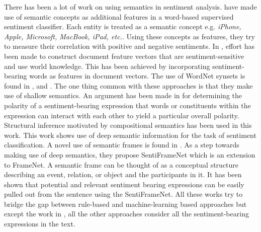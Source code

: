 There has been a lot of work on using semantics in sentiment analysis. \citep*{saif2012semantic} have made use of semantic concepts as additional features in a word-based 
supervised sentiment classifier. Each entity is treated as a semantic concept e.g. \textit{iPhone, Apple, Microsoft, MacBook, iPad, etc.}. Using these concepts as features, 
they try to measure their correlation with positive and negative sentiments. In \citep*{verma2009incorporating}, effort has been made to construct document feature vectors 
that are sentiment-sensitive and use world knowledge. This has been achieved by incorporating sentiment-bearing words as features in document vectors. The use of WordNet synsets 
is found in \citep*{balamurali2011harnessing}, \citep*{rentoumi2009sentiment} and \citep*{martin2010word}. The one thing common with these approaches is that they make use of 
shallow semantics. An argument has been made in \citep*{choi2008learning} for determining the polarity of a sentiment-bearing expression that words or constituents within the
expression can interact with each other to yield a particular overall polarity. Structural inference motivated by compositional semantics has been used in this work. This work 
shows use of deep semantic information for the task of sentiment classification. A novel use of semantic frames is found in \citep*{ruppenhofer2012semantic}. As a step towards 
making use of deep semantics, they propose SentiFrameNet which is an extension to FrameNet. A semantic frame can be thought of as a conceptual structure describing an event,
relation, or object and the participants in it. It has been shown that potential and relevant sentiment bearing expressions can be easily pulled out from the sentence using 
the SentiFrameNet. All these works try to bridge the gap between rule-based and machine-learning based approaches but except the work in \citep*{ruppenhofer2012semantic},
all the other approaches consider all the sentiment-bearing expressions in the text.


